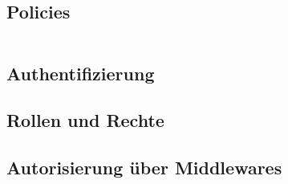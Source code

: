\subsection{Policies}
\inputminted{Sql}{assets/code/sql/policy_catalogs.sql}
\subsection{Authentifizierung}
\subsection{Rollen und Rechte}
\subsection{Autorisierung über Middlewares}